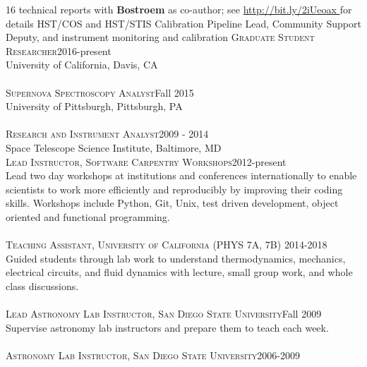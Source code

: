 \documentclass[10pt]{cv}
\begin{document}
\begin{llist}
16 technical reports with {\bf Bostroem} as co-author; see \color{blue}\url{http://bit.ly/2iUeoax }\color{black}\hspace*{0pt} for details
%
\vspace{-0.1in}   
HST/COS and HST/STIS Calibration Pipeline Lead, Community Support Deputy, and instrument monitoring and calibration
%
\vspace{-0.1in}   
    \textsc{Graduate Student Researcher}\hfill2016-present \\
    University of California, Davis, CA\\
    \\
    \textsc{Supernova Spectroscopy Analyst}\hfill Fall 2015 \\
    University of Pittsburgh, Pittsburgh, PA\\
    \\
    \textsc{Research and Instrument Analyst}\hfill 2009 - 2014 \\
     Space Telescope Science Institute, Baltimore, MD\\
%
\vspace{-0.1in}   
\textsc{Lead Instructor, Software Carpentry Workshops}\hfill 2012-present\\
Lead two day workshops at institutions and conferences internationally to enable scientists to work more efficiently and reproducibly by improving their coding skills. Workshops include Python, Git, Unix, test driven development, object oriented and functional programming.\\
\\
\textsc{Teaching Assistant, University of California} (PHYS 7A, 7B) \hfill 2014-2018\\
Guided students through lab work to understand thermodynamics, mechanics, electrical circuits, and fluid dynamics with lecture, small group work, and whole class discussions.\\
\\
\textsc{Lead Astronomy Lab Instructor, San Diego State University}\hfill Fall 2009\\
Supervise astronomy lab instructors and prepare them to teach each week. \\
\\
\textsc{Astronomy Lab Instructor, San Diego State University}\hfill 2006-2009\\

\end{llist}
\end{document}
